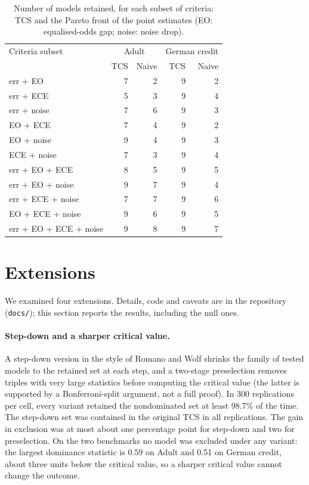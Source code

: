 \documentclass[pdflatex,sn-mathphys-num,iicol]{sn-jnl}
\theoremstyle{thmstyleone}
\theoremstyle{thmstyletwo}
\begin{document}
\begin{table}[t]\centering\footnotesize\setlength{\tabcolsep}{3pt}
\caption{Number of models retained, for each subset of criteria: TCS and the Pareto front of the point estimates (EO: equalised-odds gap; noise: noise drop).}\label{tab:sub}
\begin{tabular}{lrrrr}\toprule
Criteria subset & \multicolumn{2}{c}{Adult} & \multicolumn{2}{c}{German credit} \\
 & TCS & Naive & TCS & Naive \\\midrule
err + EO & 7 & 2 & 9 & 2 \\
err + ECE & 5 & 3 & 9 & 4 \\
err + noise & 7 & 6 & 9 & 3 \\
EO + ECE & 7 & 4 & 9 & 2 \\
EO + noise & 9 & 4 & 9 & 3 \\
ECE + noise & 7 & 3 & 9 & 4 \\
err + EO + ECE & 8 & 5 & 9 & 5 \\
err + EO + noise & 9 & 7 & 9 & 4 \\
err + ECE + noise & 7 & 7 & 9 & 6 \\
EO + ECE + noise & 9 & 6 & 9 & 5 \\
err + EO + ECE + noise & 9 & 8 & 9 & 7 \\
\bottomrule\end{tabular}
\end{table}

\section{Extensions}\label{sec:ext}
We examined four extensions. Details, code and caveats are in the repository (\texttt{docs/}); this section reports the results, including the null ones.

\paragraph{Step-down and a sharper critical value.} A step-down version in the style of Romano and Wolf \cite{romano2005} shrinks the family of tested models to the retained set at each step, and a two-stage preselection removes triples with very large statistics before computing the critical value (the latter is supported by a Bonferroni-split argument, not a full proof). In 300 replications per cell, every variant retained the nondominated set at least 98.7\% of the time. The step-down set was contained in the original TCS in all replications. The gain in exclusion was at most about one percentage point for step-down and two for preselection. On the two benchmarks no model was excluded under any variant: the largest dominance statistic is 0.59 on Adult and 0.51 on German credit, about three units below the critical value, so a sharper critical value cannot change the outcome.
\end{document}
